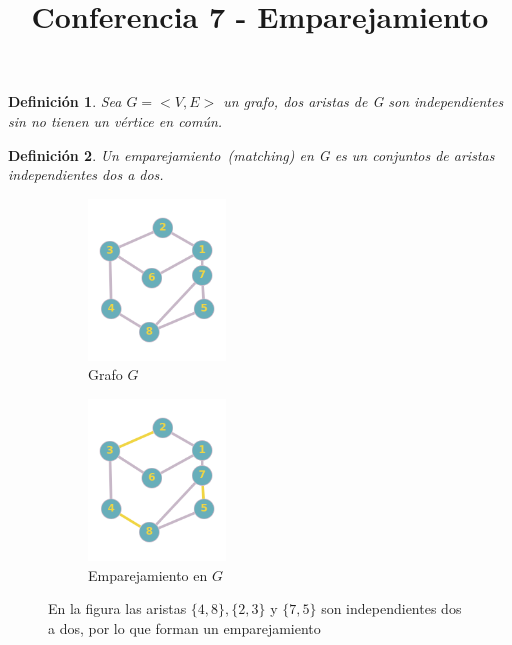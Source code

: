 \documentclass[a4paper,1pt]{report}
\title{Conferencia 7 - Emparejamiento}
\author{}
\newtheorem*{dfn}{Definición}
\begin{document}
\maketitle

\begin{dfn}
 Sea $G=<V,E>$ un grafo, dos aristas de G son independientes sin no tienen un vértice en común.
\end{dfn}


\begin{dfn}
    Un emparejamiento~(\textit{matching}) en G es un conjuntos de aristas independientes dos a dos.
\end{dfn}

\begin{figure}[H]
    \centering
    \begin{subfigure}[b]{0.40\textwidth}
        \centering
        \includegraphics[width=0.4\textwidth]{figures7/grafo.png}
        \caption{Grafo $G$}
    \end{subfigure} 
    \begin{subfigure}[b]{0.40\textwidth}
        \centering
        \includegraphics[width=0.4\textwidth]{figures7/matching.png}
        \caption{Emparejamiento en $G$}
    \end{subfigure}
    \caption{En la figura las aristas $\{ 4,8\}, \{2,3\}$ y $\{7,5\}$ son independientes dos a dos, por lo que forman un emparejamiento}
\end{figure} 
\end{document}
